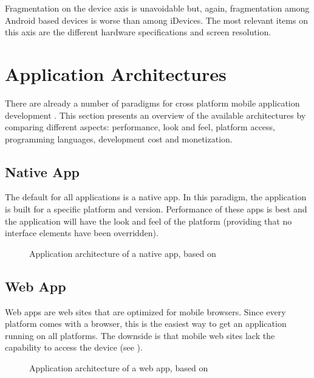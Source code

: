 \npar Fragmentation on the device axis is unavoidable but, again, fragmentation among Android based devices is worse than among iDevices. The most relevant items on this axis are the different hardware specifications and screen resolution.

\npar 

\section{Application Architectures}

\npar There are already a number of paradigms for cross platform mobile application development \citep{Friese}. This section presents an overview of the available architectures by comparing different aspects: performance, look and feel, platform access, programming languages, development cost and monetization.

\subsection{Native App}

\npar The default for all applications is a native app. In this paradigm, the application is built for a specific platform and version. Performance of these apps is best and the application will have the look and feel of the platform (providing that no interface elements have been overridden). 

\begin{figure}
    \begin{center}
        \caption{
            Application architecture of a native app, based on \citep{Friese}
        }
        \label{fig:native}
    \end{center}
\end{figure}

\subsection{Web App}

\npar Web apps are web sites that are optimized for mobile browsers. Since every platform comes with a browser, this is the easiest way to get an application running on all platforms. The downside is that mobile web sites lack the capability to access the device (see ).

\begin{figure}
    \begin{center}
        \caption{
            Application architecture of a web app, based on \citep{Friese}
        }
        \label{fig:web}
    \end{center}
\end{figure}

